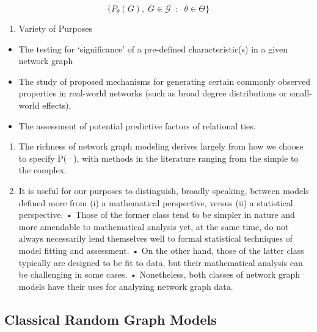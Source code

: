 \documentclass[
]{book}
\providecommand{\tightlist}{%
  \setlength{\itemsep}{0pt}\setlength{\parskip}{0pt}}
\begin{document}
{{{\[
\Big \{ 
P_\theta (G), \; G \in \mathcal G \; \; : \; \; \theta \in \Theta
\Big \}
\]

\begin{enumerate}
\def\labelenumi{\arabic{enumi}.}
\setcounter{enumi}{1}
\tightlist
\item
  Variety of Purposes
\end{enumerate}

\begin{itemize}
\tightlist
\item
  The testing for `significance' of a pre-defined characteristic(s) in a given network graph
\item
  The study of proposed mechanisms for generating certain commonly observed properties in real-world
  networks (such as broad degree distributions or small-world effects),
\item
  The assessment of potential predictive factors of relational ties.
\end{itemize}

\begin{enumerate}
\def\labelenumi{\arabic{enumi}.}
\setcounter{enumi}{2}
\item
  The richness of network graph modeling derives largely from how we choose to specify P(·), with methods in the literature ranging from the simple to the complex.
\item
  It is useful for our purposes to distinguish, broadly speaking, between models defined more from (i) a mathematical perspective, versus (ii) a statistical perspective.
  • Those of the former class tend to be simpler in nature and more amendable to mathematical analysis yet, at the same time, do not always necessarily lend themselves well to formal statistical techniques of model fitting and assessment.
  • On the other hand, those of the latter class typically are designed to be fit to data, but their mathematical analysis can be challenging in some cases.
  • Nonetheless, both classes of network graph models have their uses for analyzing network graph data.
\end{enumerate}

\hypertarget{classical-random-graph-models}{%
\subsection{Classical Random Graph Models}\label{classical-random-graph-models}}

}}}
\end{document}
